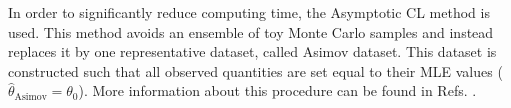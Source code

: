 In order to significantly reduce computing time, the Asymptotic CL method is used. This method  avoids an ensemble of toy Monte Carlo samples and instead replaces it by one representative dataset, called Asimov dataset. This dataset is constructed such that all observed quantities are set equal to their MLE values ($\hat{\theta}_{\mathrm{Asimov}}= \theta_0$). More information about this procedure can be found in Refs. \cite{Cowan:2010js}.
%
%



